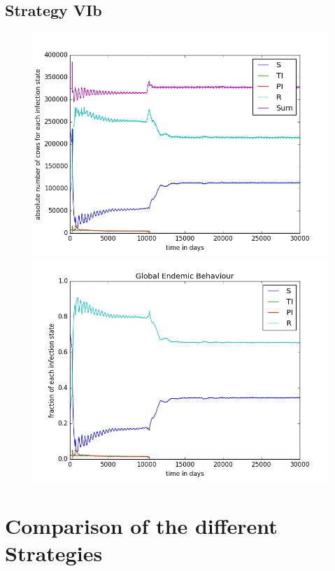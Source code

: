 \subsection{Strategy VIb}

\begin{figure}[htbp]
\begin{minipage}{0.5\textwidth}
\centering
\noindent\includegraphics[width=0.95\linewidth,height=\textheight,
keepaspectratio]{cont6btotalEndemicNumbers.png} 
\end{minipage}
\begin{minipage}{0.5\textwidth}
\centering
\noindent\includegraphics[width=0.95\linewidth,height=\textheight,
keepaspectratio]{cont6bendemicFractions.png} 
\end{minipage}
\caption[Endemic Behavior in Containment Strategy One]{}
\label{fig:demographyScen8}
\end{figure}

\section{Comparison of the different Strategies}
